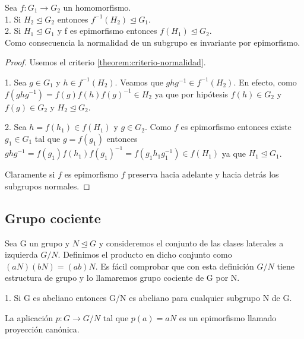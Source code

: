 \begin{theorem}
Sea $f: G_1 \rightarrow G_2$ un homomorfismo.\\
1. Si $H_2 \trianglelefteq G_2$ entonces $f^{-1}(H_2) \trianglelefteq G_1$. \\
2. Si $H_1 \trianglelefteq G_1$ y f es epimorfismo entonces $f(H_1) \trianglelefteq G_2$. \\
Como consecuencia la normalidad de un subgrupo es invariante por epimorfismo.
\end{theorem}
\begin{proof}
Usemos el criterio \ref{theorem:criterio-normalidad}. 

1. Sea $g \in G_1$ y $h \in f^{-1}(H_2)$. Veamos que $ghg^{-1} \in f^{-1}(H_2)$. En efecto, como $f(ghg^{-1}) = f(g)f(h)f(g)^{-1} \in H_2$ ya que por hipótesis $f(h) \in G_2$ y $f(g) \in G_2$ y $H_2 \trianglelefteq G_2$.

2. Sea $h=f(h_1) \in f(H_1)$ y $g \in G_2$. Como $f$ es epimorfismo entonces existe $g_1 \in G_1$ tal que $g = f(g_1)$ entonces $ghg^{-1} = f(g_1)f(h_1)f(g_1)^{-1} = f(g_1h_1g_1^{-1}) \in f(H_1)$ ya que $H_1 \trianglelefteq G_1$.

Claramente si $f$ es epimorfismo $f$ preserva hacia adelante y hacia detrás los subgrupos normales.
\end{proof}

\subsection{Grupo cociente}

\begin{definition}
Sea G un grupo y $N \unlhd G$ y consideremos el conjunto de las clases laterales a izquierda $G/N$. Definimos el producto en dicho conjunto como $(aN)(bN) = (ab)N$. Es fácil comprobar que con esta definición $G/N$ tiene estructura de grupo y lo llamaremos grupo cociente de G por N.
\end{definition}

\begin{example}
1. Si G es abeliano entonces G/N es abeliano para cualquier subgrupo N de G.
\end{example}

\begin{definition}
La aplicación $p:G \rightarrow G/N$ tal que $p(a) = aN$ es un epimorfismo llamado proyección canónica.
\end{definition}

